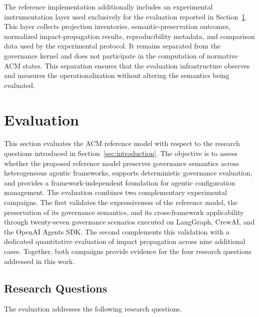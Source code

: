 \documentclass[10pt]{article}
\begin{document}
The reference implementation additionally includes an experimental instrumentation layer used exclusively for the evaluation reported in Section~\ref{sec:evaluation}. This layer collects projection inventories, semantic-preservation outcomes, normalized impact-propagation results, reproducibility metadata, and comparison data used by the experimental protocol. It remains separated from the governance kernel and does not participate in the computation of normative ACM states. This separation ensures that the evaluation infrastructure observes and measures the operationalization without altering the semantics being evaluated.


\section{Evaluation}
\label{sec:evaluation}

This section evaluates the ACM reference model with respect to the research questions introduced in Section~\ref{sec:introduction}. The objective is to assess whether the proposed reference model preserves governance semantics across heterogeneous agentic frameworks, supports deterministic governance evaluation, and provides a framework-independent foundation for agentic configuration management. The evaluation combines two complementary experimental campaigns. The first validates the expressiveness of the reference model, the preservation of its governance semantics, and its cross-framework applicability through twenty-seven governance scenarios executed on LangGraph, CrewAI, and the OpenAI Agents SDK. The second complements this validation with a dedicated quantitative evaluation of impact propagation across nine additional cases. Together, both campaigns provide evidence for the four research questions addressed in this work.

\subsection{Research Questions}
\label{sec:research_questions}

The evaluation addresses the following research questions.
\end{document}
